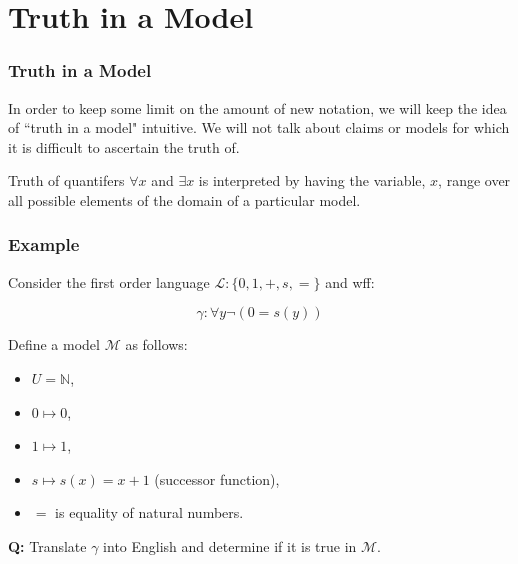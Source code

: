 \documentclass{beamer}
\theoremstyle{indentDefn} \newtheorem{defn}[]{Definition}
\begin{document}
\section{Truth in a Model}

\begin{frame}
	\frametitle{Truth in a Model}
	
	In order to keep some limit on the amount of new notation, we will keep the idea of ``truth in a model" intuitive. We will not talk about claims or models for which it is difficult to ascertain the truth of.
	
	\vspace{0.5cm}
	
	Truth of quantifers $\forall x$ and $\exists x$ is interpreted by having the variable, $x$, range over all possible elements of the domain of a particular model. 
	
\end{frame}

\begin{frame}
	\frametitle{Example}
	
	Consider the first order language $\mathcal{L}: \{0,1,+,s,=\}$ and wff: 
	
	$$ \gamma: \forall y \lnot(0 = s(y))$$
	
	\vspace{0.3cm}
	
	Define a model $\mathcal{M}$ as follows:
	\begin{itemize}
		\item[] $U = \mathbb{N}$,
		\item[] $0 \mapsto 0$,
		\item[] $1 \mapsto 1$,
		\item[] $s \mapsto s(x) = x+1$ (successor function),
		\item[] $=$ is equality of natural numbers.
	\end{itemize}
	
	\vspace{0.3cm}
	
	{\bf Q:} Translate $\gamma$ into English and determine if it is true in $\mathcal{M}$. 	
\end{frame}
\end{document}
